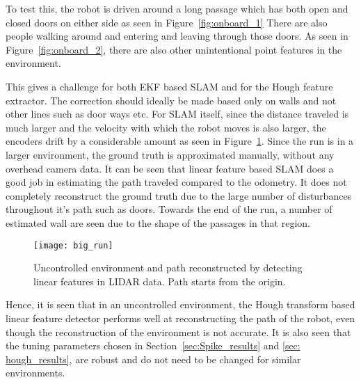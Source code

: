 To test this, the robot is driven around a long passage which has both open and closed doors on either side as seen in Figure~\ref{fig:onboard_1} There are also people walking around and entering and leaving through those doors. As seen in Figure~\ref{fig:onboard_2}, there are also other unintentional point features in the environment. 

This gives a challenge for both EKF based SLAM and for the Hough feature extractor. The correction should ideally be made based only on walls and not other lines such as door ways etc. For SLAM itself, since the distance traveled is much larger and the velocity with which the robot moves is also larger, the encoders drift by a considerable amount as seen in Figure~\ref{fig:big_run}. Since the run is in a larger environment, the ground truth is approximated manually, without any overhead camera data. It can be seen that linear feature based SLAM does a good job in estimating the path traveled compared to the odometry. It does not completely reconstruct the ground truth due to the large number of disturbances throughout it's path such as doors. Towards the end of the run, a number of estimated wall are seen due to the shape of the passages in that region. 

\begin{figure}
\centering
\texttt{[image: big\_run]}
\caption{Uncontrolled environment and path reconstructed by detecting linear features in LIDAR data. Path starts from the origin.}
\label{fig:big_run}
\end{figure}

Hence, it is seen that in an uncontrolled environment, the Hough transform based linear feature detector performs well at reconstructing the path of the robot, even though the reconstruction of the environment is not accurate. It is also seen that the tuning parameters chosen in Section~\ref{sec:Spike_results} and \ref{sec: hough_results}, are robust and do not need to be changed for similar environments. 